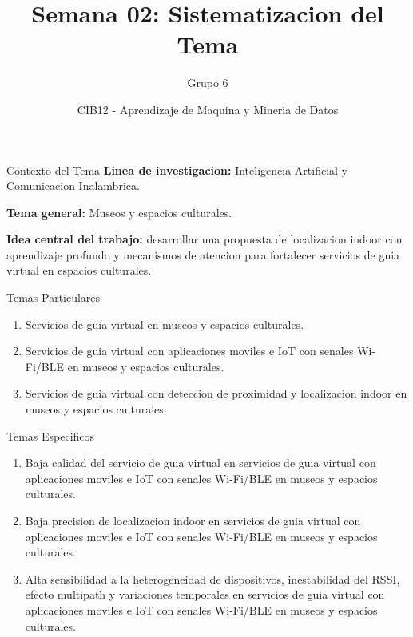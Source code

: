 \documentclass[aspectratio=169,11pt]{beamer}
\title{Semana 02: Sistematizacion del Tema}
\author{Grupo 6}
\date{CIB12 - Aprendizaje de Maquina y Mineria de Datos}
\begin{document}
\begin{frame}
  \titlepage
\end{frame}

\begin{frame}{Contexto del Tema}
\justifying
\textbf{Linea de investigacion:} Inteligencia Artificial y Comunicacion Inalambrica.

\vspace{0.6em}

\textbf{Tema general:} Museos y espacios culturales.

\vspace{0.6em}

\textbf{Idea central del trabajo:} desarrollar una propuesta de localizacion indoor con aprendizaje profundo y mecanismos de atencion para fortalecer servicios de guia virtual en espacios culturales.
\end{frame}

\begin{frame}{Temas Particulares}
\justifying
\begin{enumerate}
  \item Servicios de guia virtual en museos y espacios culturales.
  \item Servicios de guia virtual con aplicaciones moviles e IoT con senales Wi-Fi/BLE en museos y espacios culturales.
  \item Servicios de guia virtual con deteccion de proximidad y localizacion indoor en museos y espacios culturales.
\end{enumerate}
\end{frame}

\begin{frame}{Temas Especificos}
\justifying
\begin{enumerate}
  \item Baja calidad del servicio de guia virtual en servicios de guia virtual con aplicaciones moviles e IoT con senales Wi-Fi/BLE en museos y espacios culturales.
  \item Baja precision de localizacion indoor en servicios de guia virtual con aplicaciones moviles e IoT con senales Wi-Fi/BLE en museos y espacios culturales.
  \item Alta sensibilidad a la heterogeneidad de dispositivos, inestabilidad del RSSI, efecto multipath y variaciones temporales en servicios de guia virtual con aplicaciones moviles e IoT con senales Wi-Fi/BLE en museos y espacios culturales.
\end{enumerate}
\end{frame}
\end{document}
